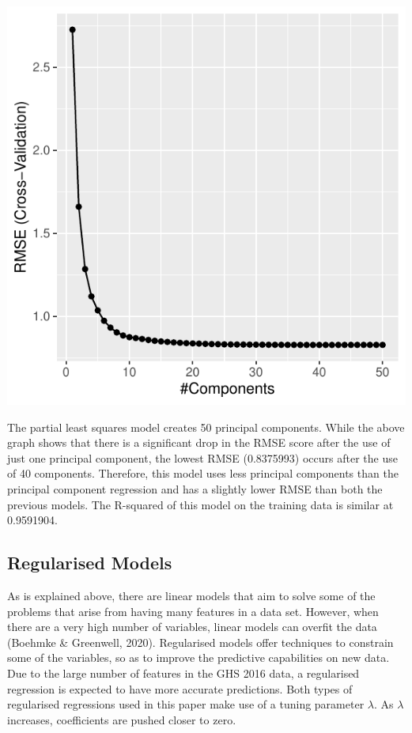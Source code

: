 \documentclass[11pt,preprint, authoryear]{elsarticle}
\numberwithin{equation}{section}
\numberwithin{figure}{section}
\numberwithin{table}{section}
\begin{document}
\begin{center}\includegraphics{MLPDF_files/figure-latex/unnamed-chunk-9-1} \end{center}

The partial least squares model creates 50 principal components. While
the above graph shows that there is a significant drop in the RMSE score
after the use of just one principal component, the lowest RMSE
(0.8375993) occurs after the use of 40 components. Therefore, this model
uses less principal components than the principal component regression
and has a slightly lower RMSE than both the previous models. The
R-squared of this model on the training data is similar at 0.9591904.

\hypertarget{regularised-models}{%
\subsection{Regularised Models}\label{regularised-models}}

As is explained above, there are linear models that aim to solve some of
the problems that arise from having many features in a data set.
However, when there are a very high number of variables, linear models
can overfit the data (Boehmke \& Greenwell, 2020). Regularised models
offer techniques to constrain some of the variables, so as to improve
the predictive capabilities on new data. Due to the large number of
features in the GHS 2016 data, a regularised regression is expected to
have more accurate predictions. Both types of regularised regressions
used in this paper make use of a tuning parameter \(\lambda\). As
\(\lambda\) increases, coefficients are pushed closer to zero.
\end{document}

